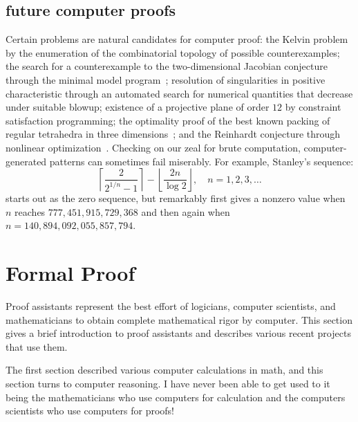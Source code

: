 \documentclass{llncs}
\begin{document}
\subsection{future computer proofs}

Certain problems are natural candidates for computer proof: the Kelvin
problem by the enumeration of the combinatorial topology of possible
counterexamples; the search for a counterexample to the
two-dimensional Jacobian conjecture through the minimal model
program~\cite{Borisov}; resolution of singularities in positive
characteristic through an automated search for numerical quantities
that decrease under suitable blowup; existence of a projective plane
of order $12$ by constraint satisfaction programming; the optimality
proof of the best known packing of regular tetrahedra in three
dimensions~\cite{Chen-2010}; and the Reinhardt conjecture through
nonlinear optimization~\cite{HR11}.  Checking on our zeal for brute
computation, computer-generated patterns can sometimes fail miserably.
For example, Stanley's sequence:
\[
\left\lceil{\frac{2}{2^{1/n} - 1}}\right\rceil- 
\left\lfloor{\frac{2 n}{\log 2}}\right\rfloor,\quad n=1,2,3,\ldots
\]
starts out as the zero sequence, but remarkably first gives a nonzero
value when $n$ reaches $777,451,915,729,368$ and then again when
$n=140,894,092,055,857,794$.






\section{Formal Proof}

Proof assistants represent the best effort of logicians, computer
scientists, and mathematicians to obtain complete mathematical rigor
by computer.  This section gives a brief introduction to proof
assistants and describes various recent projects that use them.

The first section described various computer calculations in math,
and this section turns to computer reasoning.  I have never been able to
get used to it being the mathematicians who use computers for calculation
and the computers scientists who use computers for proofs!
\end{document}
